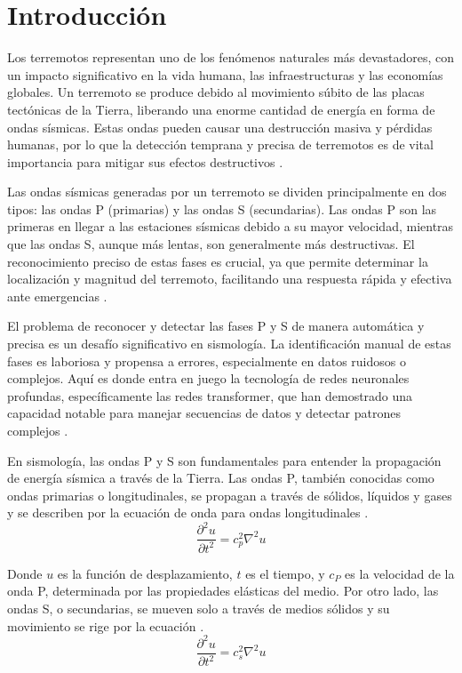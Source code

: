 \chapter{Introducción}\label{introduction}

Los terremotos representan uno de los fenómenos naturales más devastadores, con un impacto significativo en la vida humana, las infraestructuras y las economías globales. Un terremoto se produce debido al movimiento súbito de las placas tectónicas de la Tierra, liberando una enorme cantidad de energía en forma de ondas sísmicas. Estas ondas pueden causar una destrucción masiva y pérdidas humanas, por lo que la detección temprana y precisa de terremotos es de vital importancia para mitigar sus efectos destructivos \cite{Joswig} \cite{havskov2008processing}.

Las ondas sísmicas generadas por un terremoto se dividen principalmente en dos tipos: las ondas P (primarias) y las ondas S (secundarias). Las ondas P son las primeras en llegar a las estaciones sísmicas debido a su mayor velocidad, mientras que las ondas S, aunque más lentas, son generalmente más destructivas. El reconocimiento preciso de estas fases es crucial, ya que permite determinar la localización y magnitud del terremoto, facilitando una respuesta rápida y efectiva ante emergencias \cite{havskov2008processing}.

El problema de reconocer y detectar las fases P y S de manera automática y precisa es un desafío significativo en sismología. La identificación manual de estas fases es laboriosa y propensa a errores, especialmente en datos ruidosos o complejos. Aquí es donde entra en juego la tecnología de redes neuronales profundas, específicamente las redes transformer, que han demostrado una capacidad notable para manejar secuencias de datos y detectar patrones complejos \cite{havskov2008processing} \cite{SUGONDO2021e08605}.

En sismología, las ondas P y S son fundamentales para entender la propagación de energía sísmica a través de la Tierra. Las ondas P, también conocidas como ondas primarias o longitudinales, se propagan a través de sólidos, líquidos y gases y se describen por la ecuación de onda para ondas longitudinales \cite{chapman2004fundamentals} .
\begin{equation*}
\frac{\partial^{2}u}{\partial t^{2}} = c_{p}^{2}\nabla^{2}u
\end{equation*}

Donde $u$ es la función de desplazamiento, $t$ es el tiempo, y $c_{P}$ es la velocidad de la onda P, determinada por las propiedades elásticas del medio. Por otro lado, las ondas S, o secundarias, se mueven solo a través de medios sólidos y su movimiento se rige por la ecuación \cite{chapman2004fundamentals}.
\begin{equation*}
\frac{\partial^{2}u}{\partial t^{2}} = c_{s}^{2}\nabla^{2}u
\end{equation*}

